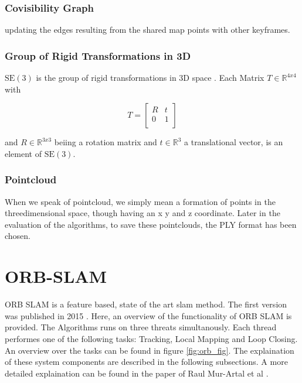 		\subsubsection{Covisibility Graph}
		
		updating the edges resulting from the shared map
		points with other keyframes.
		
		\subsubsection{Group of Rigid Transformations in 3D}
		
		$\text{SE}(3)$ is the group of rigid transformations in 3D space \cite{se3}. Each Matrix $ T \in \mathbb{R}^{4x4}$ with 
		
		$$ T = \left[
		\begin{array}{rrr}
		R &  t \\  
		0  & 1 \\ 
		\end{array} \right]$$
		
		and $ R \in \mathbb{R}^{3x3}$ beiing a rotation matrix and $ t \in \mathbb{R}^{3}$ a translational vector, is an element of $\text{SE}(3)$.
		
		\subsubsection{Pointcloud}
		
		When we speak of pointcloud, we simply mean a formation of points in the threedimensional space, though having
		an x y and z coordinate. Later in the evaluation of the algorithms, to save these pointclouds, the PLY format has 
		been chosen. 

	\section{ORB-SLAM}
	
	ORB SLAM is a feature based, state of the art slam method. The first version was published in 2015 \cite{orb}. 
	Here, an overview of the functionality of ORB SLAM is provided. The Algorithms runs on three threats simultanously.
	Each thread performes one of the following tasks: Tracking, Local Mapping and Loop Closing. An overview over the tasks can be found 
	in figure \ref{fig:orb_fig}. The explaination of these system components are described in the following subsections. 
	A more detailed explaination can be found in the paper of Raul Mur-Artal et al \cite{orb}.
	
